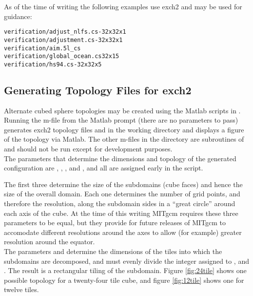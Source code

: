 As of the time of writing the following examples use exch2 and may be
used for guidance:

\begin{verbatim}
verification/adjust_nlfs.cs-32x32x1
verification/adjustment.cs-32x32x1 
verification/aim.5l_cs
verification/global_ocean.cs32x15
verification/hs94.cs-32x32x5
\end{verbatim}




\subsection{Generating Topology Files for exch2}
\label{sec:topogen}

Alternate cubed sphere topologies may be created using the Matlab
scripts in . Running the
m-file  from the Matlab prompt (there are no parameters
to pass) generates exch2 topology files 
and  in the working directory and displays a
figure of the topology via Matlab.  The other m-files in the directory
are subroutines of  and should not be run except for
development purposes. \\

The parameters that determine the dimensions and topology of the
generated configuration are , , ,
 and , and all are assigned early in the script.

The first three determine the size of the subdomains (cube faces) and
hence the size of the overall domain.  Each one determines the number
of grid points, and therefore the resolution, along the subdomain
sides in a ``great circle'' around each axis of the cube.  At the time
of this writing MITgcm requires these three parameters to be equal,
but they provide for future releases of MITgcm to accomodate different
resolutions around the axes to allow (for example) greater resolution
around the equator.\\

The parameters  and  determine the dimensions of
the tiles into which the subdomains are decomposed, and must evenly
divide the integer assigned to ,  and .
The result is a rectangular tiling of the subdomain.  Figure
\ref{fig:24tile} shows one possible topology for a twenty-four tile
cube, and figure \ref{fig:12tile} shows one for twelve tiles. \\

